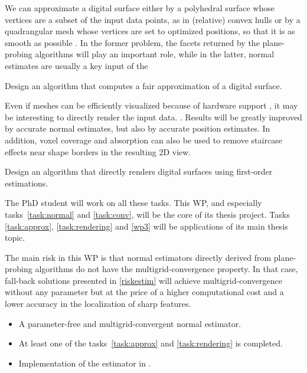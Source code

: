We can approximate a digital surface either by a polyhedral surface whose vertices 
are a subset of the input data points, as in (relative) convex hulls 
\cite{Klette2001,Schultz2009} 
or by a quadrangular mesh whose vertices are set to optimized positions, so that it is
as smooth as possible \cite{Coeurjolly2017}. In the former problem, the facets returned by the
plane-probing algorithms will play an important role, while in the latter,
normal estimates are usually a key input of the   

\begin{Task}
  \label{task:approx}
  Design an algorithm that computes a fair approximation of a digital surface. 
\end{Task}

Even if meshes can be efficiently visualized because of hardware
support ,
it may be interesting to directly render the input data. . Results will be greatly improved by accurate normal estimates,
but also by accurate position estimates. In addition, voxel coverage and absorption can
also be used to remove staircase effects near shape borders in the resulting 2D view.

\begin{Task}
  \label{task:rendering}
  Design an algorithm that directly renders digital surfaces using first-order estimations.  
\end{Task}

The PhD student will work on all these tasks. This WP, and especially tasks~\ref{task:normal}
and \ref{task:conv}, will be the core of its thesis project. Tasks \ref{task:approx},
\ref{task:rendering} and \ref{wp3} will be applications of its main thesis topic.  

\Risks
The main risk in this WP is that normal estimators
directly derived from plane-probing algorithms do not have the multigrid-convergence
property. In that case, fall-back solutions presented in \ref{riskestim} will achieve
multigrid-convergence without any parameter but at the price of a higher computational
cost and a lower accuracy in the localization of sharp features. 

\Success
\begin{itemize}
  \item A parameter-free and multigrid-convergent normal estimator.
  \item At least one of the tasks~\ref{task:approx} and \ref{task:rendering} is completed. 
  \item Implementation of the estimator in \DGtal.
\end{itemize}

